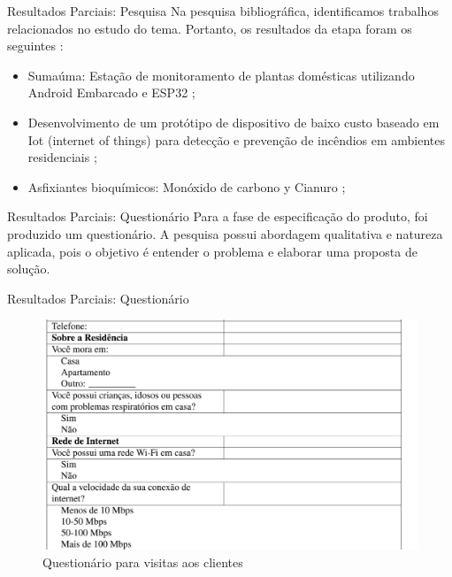 \documentclass[12pt]{beamer}
\begin{document}
    \begin{frame}{Resultados Parciais: Pesquisa}
        Na pesquisa bibliográfica, identificamos trabalhos relacionados no estudo do tema. Portanto, os resultados da etapa foram os seguintes :
        \begin{itemize}
            \item Sumaúma: Estação de monitoramento de plantas domésticas utilizando Android Embarcado e ESP32 \cite{12-UFAM-Sumauma};
            \item Desenvolvimento de um protótipo de dispositivo de baixo custo baseado em Iot (internet of things) para detecção e prevenção de incêndios em ambientes residenciais \cite{11-UEA-IOT-Prev-Inc};
            \item Asfixiantes bioquímicos: Monóxido de carbono y Cianuro \cite{hernandez2022asfixiantes};
        \end{itemize}
    \end{frame}

    \begin{frame}{Resultados Parciais: Questionário}
        Para a fase de especificação do produto, foi produzido um questionário. A pesquisa possui abordagem qualitativa e natureza aplicada, pois o objetivo é entender o problema e elaborar uma proposta de solução. 
    \end{frame}

    \begin{frame}{Resultados Parciais: Questionário}
        \begin{figure}
            \centering
            \includegraphics[width=0.8\linewidth]{quest (1).png}
            \caption{Questionário para visitas aos clientes}
            \label{fig:enter-label}
        \end{figure}
    \end{frame}
\end{document}
